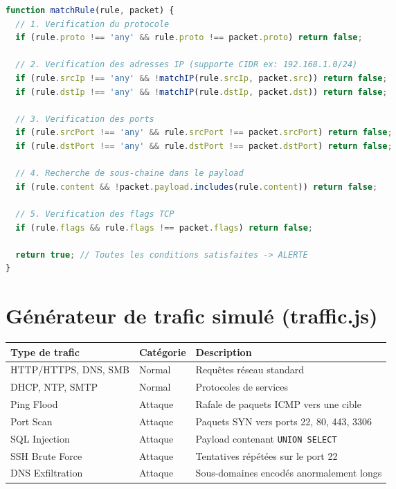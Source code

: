 \documentclass[12pt,a4paper]{report}
\newcommand{\code}[1]{\texttt{#1}}
\begin{document}
\begin{lstlisting}[language=JavaScript, caption={Algorithme de matching d'une règle Snort}]
function matchRule(rule, packet) {
  // 1. Verification du protocole
  if (rule.proto !== 'any' && rule.proto !== packet.proto) return false;

  // 2. Verification des adresses IP (supporte CIDR ex: 192.168.1.0/24)
  if (rule.srcIp !== 'any' && !matchIP(rule.srcIp, packet.src)) return false;
  if (rule.dstIp !== 'any' && !matchIP(rule.dstIp, packet.dst)) return false;

  // 3. Verification des ports
  if (rule.srcPort !== 'any' && rule.srcPort !== packet.srcPort) return false;
  if (rule.dstPort !== 'any' && rule.dstPort !== packet.dstPort) return false;

  // 4. Recherche de sous-chaine dans le payload
  if (rule.content && !packet.payload.includes(rule.content)) return false;

  // 5. Verification des flags TCP
  if (rule.flags && rule.flags !== packet.flags) return false;

  return true; // Toutes les conditions satisfaites -> ALERTE
}
\end{lstlisting}

\section{Générateur de trafic simulé (traffic.js)}

\begin{center}
\begin{tabular}{L{3.5cm} L{3cm} L{6.5cm}}
  \toprule
  \textbf{Type de trafic} & \textbf{Catégorie} & \textbf{Description} \\
  \midrule
  HTTP/HTTPS, DNS, SMB    & Normal  & Requêtes réseau standard \\
  DHCP, NTP, SMTP         & Normal  & Protocoles de services \\
  Ping Flood              & Attaque & Rafale de paquets ICMP vers une cible \\
  Port Scan               & Attaque & Paquets SYN vers ports 22, 80, 443, 3306 \\
  SQL Injection           & Attaque & Payload contenant \code{UNION SELECT} \\
  SSH Brute Force         & Attaque & Tentatives répétées sur le port 22 \\
  DNS Exfiltration        & Attaque & Sous-domaines encodés anormalement longs \\
  \bottomrule
\end{tabular}
\end{center}
\end{document}
